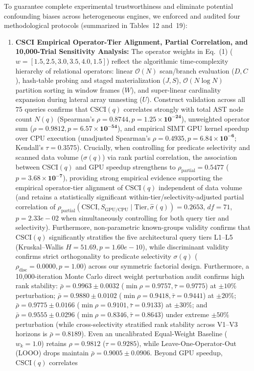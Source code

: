\documentclass[10pt,a4paper]{article}
\begin{document}
To guarantee complete experimental trustworthiness and eliminate potential confounding biases across heterogeneous engines, we enforced and audited four methodological protocols (summarized in Tables~12 and~19):
\begin{enumerate}[leftmargin=1.5em,itemsep=2pt]
    \item \textbf{CSCI Empirical Operator-Tier Alignment, Partial Correlation, and 10,000-Trial Sensitivity Analysis:} The operator weights in Eq.~(1) ($w = [1.5, 2.5, 3.0, 3.5, 4.0, 1.5]$) reflect the algorithmic time-complexity hierarchy of relational operators: linear $\mathcal{O}(N)$ scan/branch evaluation ($D, C$), hash-table probing and staged materialization ($J, S$), $\mathcal{O}(N \log N)$ partition sorting in window frames ($W$), and super-linear cardinality expansion during lateral array unnesting ($U$). Construct validation across all 75 queries confirms that $\text{CSCI}(q)$ correlates strongly with total AST node count $N(q)$ (Spearman's $\rho = \mathbf{0.8744}, p = \mathbf{1.25 \times 10^{-24}}$), unweighted operator sum ($\rho = \mathbf{0.9812}, p = \mathbf{6.57 \times 10^{-54}}$), and empirical SIMT GPU kernel speedup over CPU execution (unadjusted Spearman's $\rho = \mathbf{0.4935}, p = \mathbf{6.84 \times 10^{-6}}$; Kendall's $\tau = \mathbf{0.3575}$). Crucially, when controlling for predicate selectivity and scanned data volume ($\sigma(q)$) via rank partial correlation, the association between $\text{CSCI}(q)$ and GPU speedup strengthens to $\rho_{\text{partial}} = \mathbf{0.5477}$ ($p = \mathbf{3.68 \times 10^{-7}}$), providing strong empirical evidence supporting the empirical operator-tier alignment of $\text{CSCI}(q)$ independent of data volume (and retains a statistically significant within-tier/selectivity-adjusted partial correlation of $\rho_{\text{partial}}(\text{CSCI}, S_{\text{GPU/CPU}} \mid \text{Tier}, \hat{\sigma}(q)) = 0.2653$, $df=71$, $p=2.33e-02$ when simultaneously controlling for both query tier and selectivity). Furthermore, non-parametric known-groups validity confirms that $\text{CSCI}(q)$ significantly stratifies the five architectural query tiers L1--L5 (Kruskal--Wallis $H = 51.69, p = 1.60e-10$), while discriminant validity confirms strict orthogonality to predicate selectivity $\sigma(q)$ ($\rho_{\text{disc}} = 0.0000, p = 1.00$) across our symmetric factorial design. Furthermore, a 10,000-iteration Monte Carlo direct weight perturbation audit confirms high rank stability: $\bar{\rho} = \mathbf{0.9963} \pm 0.0032$ ($\min \rho = 0.9757, \bar{\tau}=0.9775$) at $\pm 10\%$ perturbation; $\bar{\rho} = \mathbf{0.9880} \pm 0.0102$ ($\min \rho = 0.9418, \bar{\tau}=0.9441$) at $\pm 20\%$; $\bar{\rho} = \mathbf{0.9775} \pm 0.0166$ ($\min \rho = 0.9101, \bar{\tau}=0.9133$) at $\pm 30\%$; and $\bar{\rho} = \mathbf{0.9555} \pm 0.0296$ ($\min \rho = 0.8346, \bar{\tau}=0.8643$) under extreme $\pm 50\%$ perturbation (while cross-selectivity stratified rank stability across V1--V3 horizons is $\bar{\rho}=0.8189$). Even an uncalibrated Equal-Weight Baseline ($w_k = 1.0$) retains $\rho = \mathbf{0.9812}$ ($\tau = 0.9285$), while Leave-One-Operator-Out (LOOO) drops maintain $\bar{\rho} = \mathbf{0.9005} \pm 0.0906$. Beyond GPU speedup, $\text{CSCI}(q)$ correlates 
\end{enumerate}
\end{document}

